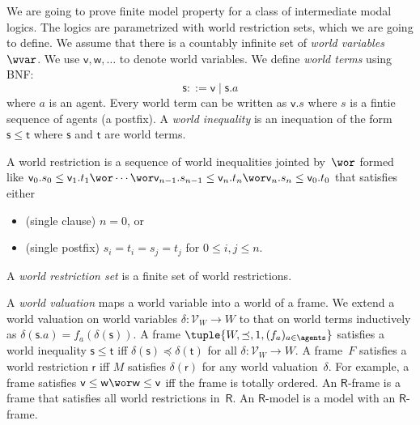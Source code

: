 \documentclass[doctor]{iscs-thesis}
\begin{document}
We are going to prove finite model property for a class of
intermediate modal logics.  The logics are parametrized with
world restriction sets,  which we are going to define.
We assume that there is a countably infinite set of \textit{world
variables}~$\wvar$.
We use $\mathsf v, \mathsf w,\ldots$ to denote world variables.
We define \textit{world terms} using BNF:
\[
 \mathsf s::=\mathsf v\mid \mathsf s.a
\]
where $a$ is an agent.
Every world term can be written as $\mathsf v.s$ where $s$ is a fintie sequence
of agents (a postfix).
A \textit{world inequality} is an inequation of the form $\mathsf s\le
\mathsf t$ where $\mathsf s$ and $\mathsf t$ are world terms.
\begin{definition}
A world restriction is a sequence of world inequalities jointed
 by~$\wor$ formed like
 $\mathsf v_0.s_0\le\mathsf v_1.t_1\wor\cdots\wor
 \mathsf v_{n-1}.s_{n-1}\le\mathsf v_n.t_n\wor \mathsf v_n.s_n\le\mathsf
 v_0.t_0$ that satisfies either
 \begin{itemize}
  \item (single clause) $n=0$, or
  \item (single postfix) $s_i = t_i = s_j = t_{j}$ for $0\le i,j\le n$.
 \end{itemize}
\end{definition}
A \textit{world restriction set} is a finite set of world restrictions.

A \textit{world valuation} maps a world variable into a world of a frame.
We extend a world valuation on world variables
$\delta\colon\mathcal V_W\rightarrow W$ to that on world terms
inductively as $\delta(\mathsf s.a)=f_a(\delta(\mathsf s))$.
A frame $\tuple{W,\preceq, 1,(f_a)_{a\in\agents}}$ satisfies a world inequality
$\mathsf s\le\mathsf t$ iff $\delta(\mathsf s)\preceq \delta(\mathsf t)$
for all $\delta\colon\mathcal V_W\rightarrow W$.
A frame~$F$ satisfies a world restriction $\mathsf r$
iff $M$ satisfies $\delta(\mathsf r)$ for any world valuation~$\delta$.
For example, a frame satisfies $\mathsf v\le \mathsf w\wor\mathsf
w\le\mathsf v$ iff the frame is totally ordered.
An $\mathsf R$-frame is a frame that
satisfies all world restrictions in~$\mathsf R$.
An $\mathsf R$-model is a model with an $\mathsf R$-frame.

\newcommand{\modelsR}{\models_{\mathsf R}}
\end{document}
